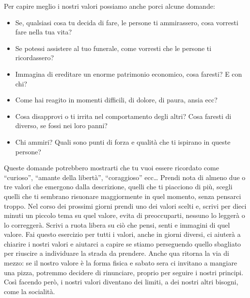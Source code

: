 \documentclass[12pt]{book} %
\begin{document}
Per capire meglio i nostri valori possiamo anche porci alcune domande:

\begin{itemize}
\item Se, qualsiasi cosa tu decida di fare, le persone ti ammirassero, cosa vorresti fare nella tua vita?
\item Se potessi assistere al tuo funerale, come vorresti che le persone ti ricordassero?
\item Immagina di ereditare un enorme patrimonio economico, cosa faresti? E con chi?
\item Come hai reagito in momenti difficili, di dolore, di paura, ansia ecc?
\item Cosa disapprovi o ti irrita nel comportamento degli altri? Cosa faresti di diverso, se fossi nei loro panni?
\item Chi ammiri? Quali sono punti di forza e qualità che ti ispirano in queste persone?
\end{itemize}

Queste domande potrebbero mostrarti che tu vuoi essere ricordato come “curioso”, “amante della libertà”, “coraggioso” ecc… 
Prendi nota di almeno due o tre valori che emergono dalla descrizione, quelli che ti piacciono di più,
scegli quelli che ti sembrano risuonare maggiormente in quel momento, senza pensarci troppo. Nel corso dei prossimi giorni
prendi uno dei valori scelti e, scrivi per dieci minuti un piccolo tema su quel valore, evita di preoccuparti, nessuno
lo leggerà o lo correggerà. Scrivi a ruota libera su ciò che pensi, senti e immagini di quel valore. Fai questo
esercizio per tutti i valori, anche in giorni diversi, ci aiuterà a chiarire i nostri valori e aiutarci a capire se
stiamo perseguendo quello sbagliato per riuscire a individuare la strada da prendere. Anche qua ritorna la via di
mezzo: se il nostro valore è la forma fisica e sabato sera ci invitano a mangiare una pizza, potremmo decidere di
rinunciare, proprio per seguire i nostri principi. Così facendo però, i nostri valori diventano dei limiti, a dei
nostri altri bisogni, come la socialità.
\end{document}
